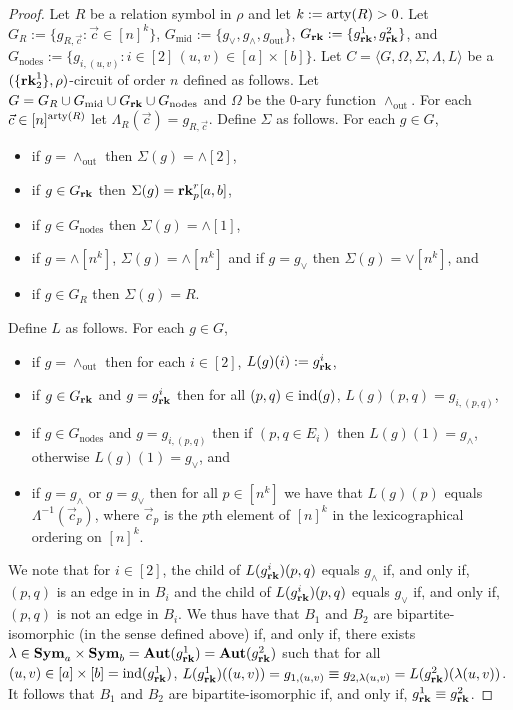 \documentclass[../paper.tex]{subfiles}
\begin{document}
\begin{proof}
  Let $R$ be a relation symbol in $\rho$ and let $k := \mathrm{arty}(R) > 0$. Let $G_{R}
  := \{g_{R, \vec{c}} : \vec{c} \in [n]^k\}$, $G_{\text{mid}} := \{g_{\lor},
  g_{\land}, g_{\text{out}} \}$, $G_{\text{\textbf{rk}}} : = \{ g^1_{\text{\textbf{rk}}}, g^2_{\text{\textbf{rk}}}\}$,
  and $G_{\text{nodes}} := \{g_{i, (u,v)} : i \in [2] \, (u,v) \in [a] \times
  [b] \}$. Let $C = \langle G, \Omega, \Sigma, \Lambda, L \rangle$ be a
  $(\{\text{\textbf{rk}}^{1}_2\}, \rho)$-circuit of order $n$ defined as follows. Let $G =
  G_R \cup G_{\text{mid}} \cup G_{\text{\textbf{rk}}} \cup G_{\text{nodes}}$ and $\Omega$ be
  the $0$-ary function $\land_{\text{out}}$. For each $\vec{c} \in
  [n]^{\mathrm{arty}(R)}$ let $\Lambda_R(\vec{c}) = g_{R, \vec{c}}$. Define $\Sigma$ as
  follows. For each $g \in G$,
  \begin{itemize}
    \setlength\itemsep{0mm}
  \item if $g = \land_{\text{out}}$ then $\Sigma(g) = \land[2]$,
  \item if $g \in G_{\text{\textbf{rk}}}$ then $\Sigma(g) = \text{\textbf{rk}}^r_p [a,b]$,
  \item if $g \in G_{\text{nodes}}$ then $\Sigma(g) = \land[1]$,
  \item if $g = \land[n^k]$, $\Sigma (g) = \land[n^k]$ and if $g = g_{\lor}$
    then $\Sigma(g) = \lor[n^k]$, and
  \item if $g \in G_R$ then $\Sigma(g) = R$.
  \end{itemize}
  Define $L$ as follows. For each $g \in G$,
  \begin{itemize}
    \setlength\itemsep{0mm}
  \item if $g = \land_{\text{out}}$ then for each $i \in [2]$, $L(g)(i) :=
    g^i_{\text{\textbf{rk}}}$,
  \item if $g \in G_{\text{\textbf{rk}}}$ and $g = g^i_{\text{\textbf{rk}}}$ then for all $(p,q) \in
    \text{\upshape ind}(g)$, $L(g)(p,q) = g_{i, (p,q)}$,
  \item if $g \in G_{\text{nodes}}$ and $g = g_{i, (p,q)}$ then if $(p, q \in
    E_i)$ then $L(g)(1) = g_{\land}$, otherwise $L(g)(1) = g_\lor$, and
  \item if $g = g_\land$ or $g = g_\lor$ then for all $p \in [n^k]$ we have that
    $L(g)(p)$ equals $\Lambda^{-1}(\vec{c}_p)$, where $\vec{c}_p$ is the $p$th
    element of $[n]^k$ in the lexicographical ordering on $[n]^k$.
  \end{itemize}

  We note that for $i \in [2]$, the child of $L(g^i_{\text{\textbf{rk}}})(p,q)$ equals
  $g_\land$ if, and only if, $(p,q)$ is an edge in in $B_i$ and the child of
  $L(g^i_{\text{\textbf{rk}}})(p,q) $ equals $g_\lor$ if, and only if, $(p,q)$ is not an edge
  in $B_i$. We thus have that $B_1$ and $B_2$ are bipartite-isomorphic (in the
  sense defined above) if, and only if, there exists $\lambda \in \text{\textbf{Sym}}_{a}
  \times \text{\textbf{Sym}}_{b} = \text{\textbf{Aut}}(g^1_{\text{\textbf{rk}}}) = \text{\textbf{Aut}}(g^2_{\text{\textbf{rk}}})$ such that for all
  $(u,v) \in [a] \times [b] = \text{\upshape ind}(g^1_{\text{\textbf{rk}}})$, $L(g^1_{\text{\textbf{rk}}})((u,v)) = g_{1,
    (u,v)} \equiv g_{2, \lambda (u,v)} = L(g^2_{\text{\textbf{rk}}})(\lambda (u,v))$. It
  follows that $B_1$ and $B_2$ are bipartite-isomorphic if, and only if,
  $g^1_{\text{\textbf{rk}}} \equiv g^2_{\text{\textbf{rk}}}$.


\end{proof}
\end{document}
